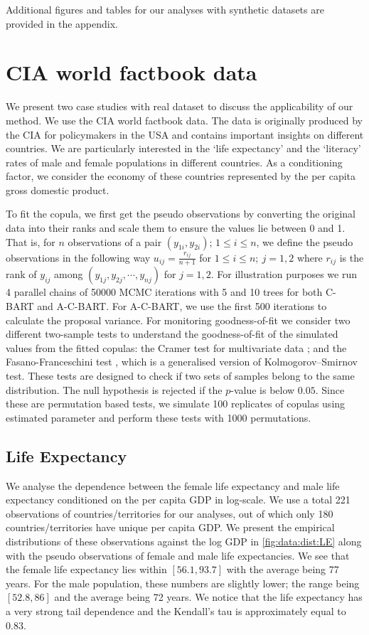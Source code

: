 \documentclass[
12pt]{article}
\begin{document}
	Additional figures and tables for our analyses with synthetic datasets are provided in the appendix.
	
	\section{CIA world factbook data}\label{sec:cia}
	We present two case studies with real dataset to discuss the applicability of our method. We use the CIA world factbook data. The data is originally produced by the CIA for policymakers in the USA and contains important insights on different countries. We are particularly interested in the `life expectancy' and the `literacy' rates of male and female populations in different countries. As a conditioning factor, we consider the economy of these countries represented by the per capita gross domestic product. 
	
	To fit the copula, we first get the pseudo observations by converting the original data into their ranks and scale them to ensure the values lie between 0 and 1. That is, for $n$ observations of a  pair $(y_{1i}, y_{2i})$; $1\le i\le n$, we define the pseudo observations in the following way $u_{ij} = \frac{r_{ij}}{n+1}$ for $1\le i \le n;\ j = 1,2$ where $r_{ij}$ is the rank of $y_{ij}$ among $(y_{1j}, y_{2j},\cdots, y_{nj})$ for $j=1,2$. For illustration purposes we run 4 parallel chains of 50000 MCMC iterations with 5 and 10 trees for both C-BART and A-C-BART. For A-C-BART, we use the first 500 iterations to calculate the proposal variance. For monitoring goodness-of-fit we consider two different two-sample tests to understand the goodness-of-fit of the simulated values from the fitted copulas: the Cramer test for multivariate data \citep{BARINGHAUS2004190}; and the Fasano-Franceschini test \citep{fasano-franceschini}, which is a generalised version of Kolmogorov–Smirnov test. These tests are designed to check if two sets of samples belong to the same distribution. The null hypothesis is rejected if the $p$-value is below $0.05$. Since these are permutation based tests, we simulate 100 replicates of copulas using estimated parameter and perform these tests with 1000 permutations.
	
	\subsection{Life Expectancy}
	We analyse the dependence between the female life expectancy and male life expectancy conditioned on the per capita GDP in log-scale. We use a total 221 observations of countries/territories for our analyses, out of which only 180 countries/territories have unique per capita GDP. We present the empirical distributions of these observations against the log GDP in \cref{fig:data:dist:LE} along with the pseudo observations of female and male life expectancies. We see that the female life expectancy lies within $[56.1,93.7]$ with the average being 77 years. For the male population, these numbers are slightly lower; the range being $[52.8, 86]$ and the average being 72 years. We notice that the life expectancy has a very strong tail dependence and the Kendall's tau is approximately equal to 0.83. 
	
\end{document}
